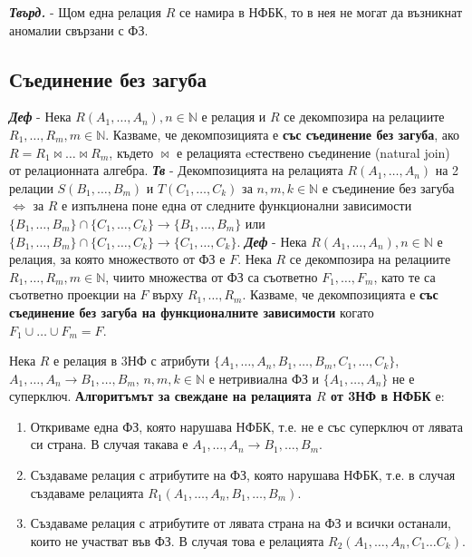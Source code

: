 \documentclass[fleqn,12pt]{article}
\begin{document}
\textbf{\textit{Твърд.}} - Щом една релация $R$ се намира в НФБК, то в нея не могат да възникнат аномалии свързани с ФЗ.

\subsection{Съединение без загуба}

\textbf{\textit{Деф}} - Нека $R(A_1, \dots, A_n), n \in \mathbb{N}$ е релация и $R$ се декомпозира на релациите $R_1, \dots, R_m, m \in \mathbb{N}$.
Казваме, че декомпозицията е \textbf{със съединение без загуба}, ако $R = R_1 \bowtie \dots \bowtie R_m$, където $\bowtie$ е релацията eстествено съединение (natural join) от релационната алгебра.
\bigbreak
\textbf{\textit{Тв}} - Декомпозицията на релацията $R(A_1, \dots, A_n)$ на 2 релации $S(B_1, \dots, B_m)$ и $T(C_1, \dots, C_k)$ за $n, m, k \in \mathbb{N}$ е съединение без загуба $\iff$ за $R$ е изпълнена поне една от следните функционални зависимости $\{B_1, \dots, B_m\} \cap \{C_1, \dots, C_k\} \rightarrow \{B_1, \dots, B_m\}$ или $\{B_1, \dots, B_m\} \cap \{C_1, \dots, C_k\} \rightarrow \{C_1, \dots, C_k\}$.
\bigbreak
\textbf{\textit{Деф}} - Нека $R(A_1, \dots, A_n), n \in \mathbb{N}$ е релация, за която множеството от ФЗ е $F$.
Нека $R$ се декомпозира на релациите $R_1, \dots, R_m, m \in \mathbb{N}$, чиито множества от ФЗ са съответно $F_1, \dots, F_m$, като те са съответно проекции на $F$ върху $R_1, \dots, R_m$.
Казваме, че декомпозицията е \textbf{със съединение без загуба на функционалните зависимости} когато $F_1 \cup \dots \cup F_m = F$.
\bigbreak

Нека $R$ е релация в 3НФ с атрибути $\{A_1, \dots, A_n, B_1, \dots, B_m, C_1, \dots, C_k\}$, $A_1, \dots, A_n \rightarrow B_1, \dots, B_m$, $n, m, k \in \mathbb{N}$ е нетривиална ФЗ и $\{A_1, \dots, A_n\}$ не е суперключ.
\textbf{Алгоритъмът за свеждане на релацията $R$ от 3НФ в НФБК} е:
\begin{enumerate}
    \item Откриваме една ФЗ, която нарушава НФБК, т.е. не е със суперключ от лявата си страна. В случая такава е $A_1, \dots, A_n \rightarrow B_1, \dots, B_m$.
    \item Създаваме релация с атрибутите на ФЗ, която нарушава НФБК, т.е. в случая създаваме релацията $R_1(A_1, \dots, A_n, B_1, \dots, B_m)$.
    \item Създаваме релация с атрибутите от лявата страна на ФЗ и всички останали, които не участват във ФЗ. В случая това е релацията $R_2(A_1, \dots, A_n, C_1 \dots C_k)$.
\end{enumerate}
\end{document}

